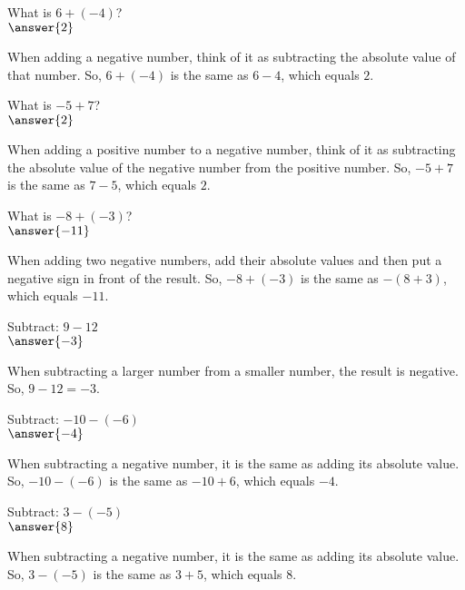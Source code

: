 \documentclass{ximera}
\begin{document}
\begin{problem}
What is $6 + (-4)$?\\
$\answer{2}$
\begin{feedback}
When adding a negative number, think of it as subtracting the absolute value of that number. So, $6 + (-4)$ is the same as $6 - 4$, which equals $2$.
\end{feedback}
\end{problem}

\begin{problem}
What is $-5 + 7$?\\
$\answer{2}$
\begin{feedback}
When adding a positive number to a negative number, think of it as subtracting the absolute value of the negative number from the positive number. So, $-5 + 7$ is the same as $7 - 5$, which equals $2$.
\end{feedback}
\end{problem}

\begin{problem}
What is $-8 + (-3)$?\\
$\answer{-11}$
\begin{feedback}
When adding two negative numbers, add their absolute values and then put a negative sign in front of the result. So, $-8 + (-3)$ is the same as $-(8 + 3)$, which equals $-11$.
\end{feedback}
\end{problem}

\begin{problem}
Subtract: $9 - 12$\\
$\answer{-3}$
\begin{feedback}
When subtracting a larger number from a smaller number, the result is negative. So, $9 - 12 = -3$.
\end{feedback}
\end{problem}

\begin{problem}
Subtract: $-10 - (-6)$\\
$\answer{-4}$
\begin{feedback}
When subtracting a negative number, it is the same as adding its absolute value. So, $-10 - (-6)$ is the same as $-10 + 6$, which equals $-4$.
\end{feedback}
\end{problem}

\begin{problem}
Subtract: $3 - (-5)$\\
$\answer{8}$
\begin{feedback}
When subtracting a negative number, it is the same as adding its absolute value. So, $3 - (-5)$ is the same as $3 + 5$, which equals $8$.
\end{feedback}
\end{problem}
\end{document}

